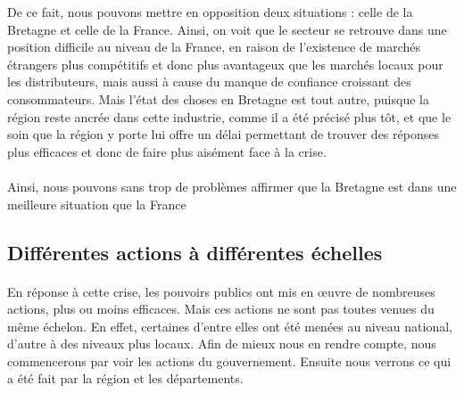\documentclass[a4paper,10pt]{report}
\begin{document}
			De ce fait, nous pouvons mettre en opposition deux situations : celle de la Bretagne et celle de la France. Ainsi, on voit que le secteur se retrouve dans une position difficile au niveau de la France, en raison de l’existence de marchés étrangers plus compétitifs et donc plus avantageux que les marchés locaux pour les distributeurs, mais aussi à cause du manque de confiance croissant des consommateurs. Mais l’état des choses en Bretagne est tout autre, puisque la région reste ancrée dans cette industrie, comme il a été précisé plus tôt, et que le soin que la région y porte lui offre un délai permettant de trouver des réponses plus efficaces et donc de faire plus aisément face à la crise.

			\paragraph{}Ainsi, nous pouvons sans trop de problèmes affirmer que la Bretagne est dans une meilleure situation que la France
			
		\subsection{Différentes actions à différentes échelles}
			\paragraph{}En réponse à cette crise, les pouvoirs publics ont mis en œuvre de nombreuses actions, plus ou moins efficaces. Mais ces actions ne sont pas toutes venues du même échelon. En effet, certaines d'entre elles ont été menées au niveau national, d'autre à des niveaux plus locaux. Afin de mieux nous en rendre compte, nous commencerons par voir les actions du gouvernement. Ensuite nous verrons ce qui a été fait par la région et les départements.
\end{document}

